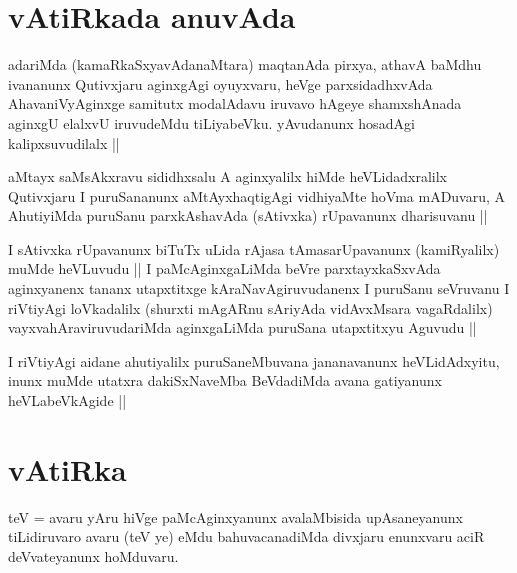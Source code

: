 \section*{vAtiRkada anuvAda}

\begin{artha}
adariMda (kamaRkaSxyavAdanaMtara) maqtanAda pirxya, athavA baMdhu
ivananunx Qutivxjaru aginxgAgi oyuyxvaru, heVge parxsidadhxvAda
AhavaniVyAginxge samitutx modalAdavu iruvavo hAgeye shamxshAnada
aginxgU elalxvU iruvudeMdu tiLiyabeVku. yAvudanunx hosadAgi
kalipxsuvudilalx ||
\end{artha}

\begin{artha}
aMtayx saMsAkxravu sididhxsalu A aginxyalilx hiMde heVLidadxralilx
Qutivxjaru I puruSananunx aMtAyxhaqtigAgi vidhiyaMte hoVma mADuvaru, A
AhutiyiMda puruSanu parxkAshavAda (sAtivxka) rUpavanunx dharisuvanu ||
\end{artha}

\begin{artha}
I sAtivxka rUpavanunx biTuTx uLida rAjasa tAmasarUpavanunx
(kamiRyalilx) muMde heVLuvudu || I paMcAginxgaLiMda beVre
parxtayxkaSxvAda aginxyanenx tananx utapxtitxge kAraNavAgiruvudanenx I
puruSanu seVruvanu I riVtiyAgi loVkadalilx (shurxti mAgARnu sAriyAda
vidAvxMsara vagaRdalilx) vayxvahAraviruvudariMda aginxgaLiMda puruSana
utapxtitxyu Aguvudu ||
\end{artha}


\begin{artha}
I riVtiyAgi aidane ahutiyalilx puruSaneMbuvana jananavanunx
heVLidAdxyitu, inunx muMde utatxra dakiSxNaveMba BeVdadiMda avana
gatiyanunx heVLabeVkAgide ||
\end{artha}

\stext


\section*{vAtiRka}


\begin{artha}
teV = avaru yAru hiVge paMcAginxyanunx avalaMbisida upAsaneyanunx
tiLidiruvaro avaru (teV ye) eMdu bahuvacanadiMda divxjaru enunxvaru
aciR deVvateyanunx hoMduvaru.
\end{artha}

